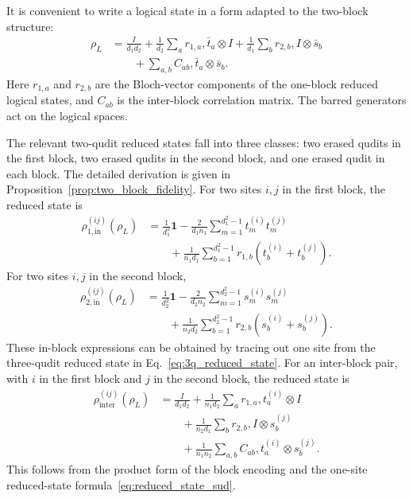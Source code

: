 \documentclass[10pt,twocolumn,superscriptaddress,aps,amsmath,amssymb,citeautoscript,floatfix,prx]{revtex4-2}
\theoremstyle{plain}
\theoremstyle{plain}
\theoremstyle{plain}
\theoremstyle{plain}
\theoremstyle{plain}
\theoremstyle{plain}
\theoremstyle{plain}
\theoremstyle{definition}
\theoremstyle{plain}
\begin{document}
It is convenient to write a logical state in a form adapted to the two-block structure:
$$
\begin{aligned}
\rho_L
&=
\frac{I}{d_1d_2}
+
\frac{1}{d_2}
\sum_a r_{1,a},\bar t_a\otimes I
+
\frac{1}{d_1}
\sum_b r_{2,b},I\otimes\bar s_b
\\
&\qquad
+
\sum_{a,b}
C_{ab},\bar t_a\otimes\bar s_b .
\end{aligned}
$$
Here $r_{1,a}$ and $r_{2,b}$ are the Bloch-vector components of the one-block reduced logical states, and $C_{ab}$ is the inter-block correlation matrix. 
The barred generators act on the logical spaces.

The relevant two-qudit reduced states fall into three classes: two erased qudits in the first block, two erased qudits in the second block, and one erased qudit in each block. 
The detailed derivation is given in Proposition~\ref{prop:two_block_fidelity}. For two sites $i,j$ in the first block, the reduced state is
$$
\begin{aligned}
\rho_{1,\mathrm{in}}^{(ij)}(\rho_L)
&=
\frac{1}{d_1^2}\mathbf 1
-
\frac{2}{d_1n_1}
\sum_{m=1}^{d_1^2-1}
t_m^{(i)}t_m^{(j)}
\\
&\qquad
+
\frac{1}{n_1d_1}
\sum_{b=1}^{d_1^2-1}
r_{1,b}
\left(
t_b^{(i)}
+
t_b^{(j)}
\right).
\end{aligned}
$$
For two sites $i,j$ in the second block,
$$
\begin{aligned}
\rho_{2,\mathrm{in}}^{(ij)}(\rho_L)
&=
\frac{1}{d_2^2}\mathbf 1
-
\frac{2}{d_2n_2}
\sum_{m=1}^{d_2^2-1}
s_m^{(i)}s_m^{(j)}
\\
&\qquad
+
\frac{1}{n_2d_2}
\sum_{b=1}^{d_2^2-1}
r_{2,b}
\left(
s_b^{(i)}
+
s_b^{(j)}
\right).
\end{aligned}
$$
These in-block expressions can be obtained by tracing out one site from the three-qudit reduced state in Eq.~\eqref{eq:3q_reduced_state}.
 For an inter-block pair, with $i$ in the first block and $j$ in the second block, the reduced state is
$$
\begin{aligned}
\rho_{\mathrm{inter}}^{(ij)}(\rho_L)
&=
\frac{I}{d_1d_2}
+
\frac{1}{n_1d_2}
\sum_a r_{1,a},t_a^{(i)}\otimes I
\\
&\qquad
+
\frac{1}{n_2d_1}
\sum_b r_{2,b},I\otimes s_b^{(j)} \\
&\qquad
+
\frac{1}{n_1n_2}
\sum_{a,b}
C_{ab},t_a^{(i)}\otimes s_b^{(j)} .
\end{aligned}
$$
This follows from the product form of the block encoding and the one-site reduced-state formula~\eqref{eq:reduced_state_sud}.
\end{document}
